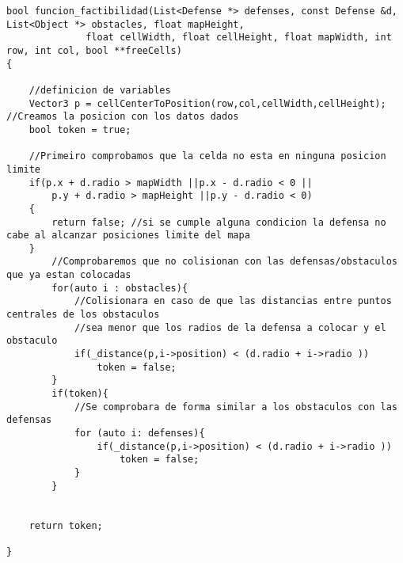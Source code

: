 
\begin{lstlisting}
bool funcion_factibilidad(List<Defense *> defenses, const Defense &d, List<Object *> obstacles, float mapHeight,
              float cellWidth, float cellHeight, float mapWidth, int row, int col, bool **freeCells)
{

    //definicion de variables
    Vector3 p = cellCenterToPosition(row,col,cellWidth,cellHeight); //Creamos la posicion con los datos dados
    bool token = true;

    //Primeiro comprobamos que la celda no esta en ninguna posicion limite
    if(p.x + d.radio > mapWidth ||p.x - d.radio < 0 ||
        p.y + d.radio > mapHeight ||p.y - d.radio < 0)
    {
        return false; //si se cumple alguna condicion la defensa no cabe al alcanzar posiciones limite del mapa
    }    
        //Comprobaremos que no colisionan con las defensas/obstaculos que ya estan colocadas
        for(auto i : obstacles){
            //Colisionara en caso de que las distancias entre puntos centrales de los obstaculos
            //sea menor que los radios de la defensa a colocar y el obstaculo
            if(_distance(p,i->position) < (d.radio + i->radio ))
                token = false;
        }
        if(token){
            //Se comprobara de forma similar a los obstaculos con las defensas
            for (auto i: defenses){
                if(_distance(p,i->position) < (d.radio + i->radio ))
                    token = false;
            }
        }
        
        
    return token;      

}

\end{lstlisting}
